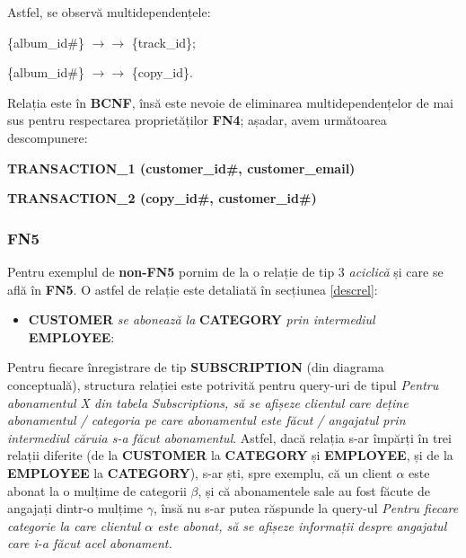 \documentclass[a4paper, oneside, 12pt]{article}
\begin{document}
\medskip

Astfel, se observă multidependențele:

\begin{m_itemize}
\item \{album\_id\#\} $\rightarrow\rightarrow$ \{track\_id\};
\item \{album\_id\#\} $\rightarrow\rightarrow$ \{copy\_id\}.
\end{m_itemize}

Relația este în \textbf{BCNF}, însă este nevoie de eliminarea multidependențelor de mai sus pentru respectarea proprietăților \textbf{FN4}; așadar, avem următoarea descompunere:

\begin{m_itemize}
        \item \textbf{TRANSACTION\_1 (customer\_id\#, customer\_email)}
        \item \textbf{TRANSACTION\_2 (copy\_id\#, customer\_id\#)}
\end{m_itemize}

\subsubsection{\textbf{FN5}}

Pentru exemplul de \textbf{non-FN5} pornim de la o relație de tip 3 \emph{aciclică} și care se află în \textbf{FN5}. O astfel de relație este detaliată în secțiunea \ref{descrel}:

\begin{itemize}[label=\textbullet, noitemsep, topsep=0pt, after=]

\item \textbf{CUSTOMER} \emph{se abonează la} \textbf{CATEGORY} \emph{prin intermediul} \textbf{EMPLOYEE}:

\end{itemize}

Pentru fiecare înregistrare de tip \textbf{SUBSCRIPTION} (din diagrama
conceptuală), structura relației este potrivită pentru query-uri de tipul
\emph{Pentru abonamentul X din tabela Subscriptions, să se afișeze clientul
care deține abonamentul / categoria pe care abonamentul este făcut / angajatul
prin intermediul căruia s-a făcut abonamentul}. Astfel, dacă relația s-ar
împărți în trei relații diferite (de la \textbf{CUSTOMER} la \textbf{CATEGORY}
și \textbf{EMPLOYEE}, și de la \textbf{EMPLOYEE} la \textbf{CATEGORY}), s-ar
ști, spre exemplu, că un client $\alpha$ este abonat la o mulțime de categorii
$\beta$, și că abonamentele sale au fost făcute de angajați dintr-o mulțime $\gamma$,
însă nu s-ar putea răspunde la query-ul \emph{Pentru fiecare categorie la care
clientul $\alpha$ este abonat, să se afișeze informații despre angajatul care
i-a făcut acel abonament.}
\end{document}
